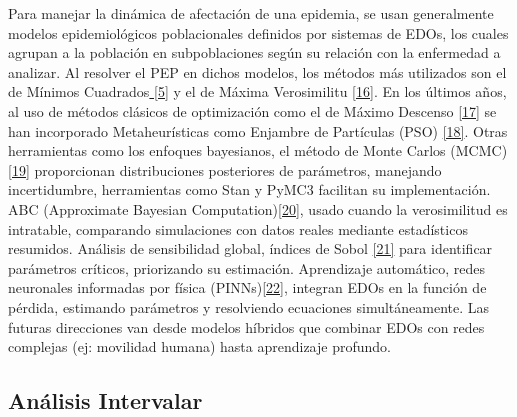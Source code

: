\documentclass{article}
\begin{document}
    
    Para manejar la dinámica de afectación de una epidemia, se usan generalmente modelos epidemiológicos poblacionales definidos por sistemas de EDOs, 
    los cuales agrupan a la población en subpoblaciones según su relación con la enfermedad a analizar. Al resolver el PEP en dichos modelos, los métodos 
    más utilizados son el de Mínimos Cuadrados\hyperref[sec:5]{ [5]} y el de Máxima Verosimilitu \hyperref[sec:27]{[16]}. En los últimos años, al uso de métodos clásicos 
    de optimización como el de Máximo Descenso \hyperref[sec:27]{[17]} se han incorporado Metaheurísticas como Enjambre de Partículas (PSO) \hyperref[sec:28]{[18]}. Otras herramientas como los enfoques bayesianos, el método de Monte 
    Carlos (MCMC) \hyperref[sec:29]{[19]} proporcionan distribuciones posteriores de parámetros, manejando incertidumbre, herramientas como Stan y PyMC3 facilitan su implementación. 
    ABC (Approximate Bayesian Computation)\hyperref[sec:30]{[20]}, usado cuando la verosimilitud es intratable, comparando simulaciones con datos reales mediante estadísticos resumidos. 
    Análisis de sensibilidad global, índices de Sobol \hyperref[sec:31]{[21]} para identificar parámetros críticos, priorizando su estimación. Aprendizaje automático, redes neuronales 
    informadas por física (PINNs)\hyperref[sec:32]{[22]}, integran EDOs en la función de pérdida, estimando parámetros y resolviendo ecuaciones simultáneamente. Las futuras direcciones van desde modelos híbridos que combinar EDOs con redes 
    complejas (ej: movilidad humana) hasta aprendizaje profundo.
    
    \subsection*{ \Large Análisis Intervalar}
\end{document}
